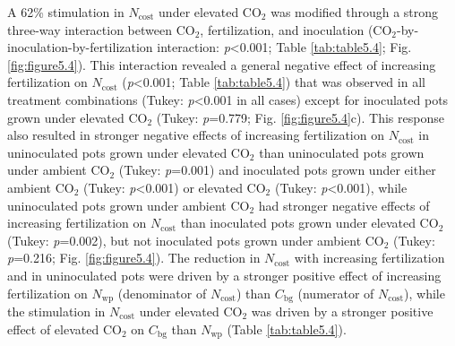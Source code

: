 A 62\% stimulation in $N_\mathrm{cost}$ under elevated CO$_2$ was modified through a strong three-way interaction between CO$_2$, fertilization, and inoculation (CO$_2$-by-inoculation-by-fertilization interaction: \textit{p}<0.001; Table \ref{tab:table5.4}; Fig. \ref{fig:figure5.4}). This interaction revealed a general negative effect of increasing fertilization on $N_\mathrm{cost}$ (\textit{p}<0.001; Table \ref{tab:table5.4}) that was observed in all treatment combinations (Tukey: \textit{p}<0.001 in all cases) except for inoculated pots grown under elevated CO$_2$ (Tukey: \textit{p}=0.779; Fig. \ref{fig:figure5.4}c). This response also resulted in stronger negative effects of increasing fertilization on $N_\mathrm{cost}$ in uninoculated pots grown under elevated CO$_2$ than uninoculated pots grown under ambient CO$_2$ (Tukey: \textit{p}=0.001) and inoculated pots grown under either ambient CO$_2$ (Tukey: \textit{p}<0.001) or elevated CO$_2$ (Tukey: \textit{p}<0.001), while uninoculated pots grown under ambient CO$_2$ had stronger negative effects of increasing fertilization on $N_\mathrm{cost}$ than inoculated pots grown under elevated CO$_2$ (Tukey: \textit{p}=0.002), but not inoculated pots grown under ambient CO$_2$ (Tukey: \textit{p}=0.216; Fig. \ref{fig:figure5.4}). The reduction in $N_\mathrm{cost}$ with increasing fertilization and in uninoculated pots were driven by a stronger positive effect of increasing fertilization on $N_\mathrm{wp}$ (denominator of $N_\mathrm{cost}$) than $C_\mathrm{bg}$ (numerator of $N_\mathrm{cost}$), while the stimulation in $N_\mathrm{cost}$ under elevated CO$_2$ was driven by a stronger positive effect of elevated CO$_2$ on $C_\mathrm{bg}$ than $N_\mathrm{wp}$ (Table \ref{tab:table5.4}).

